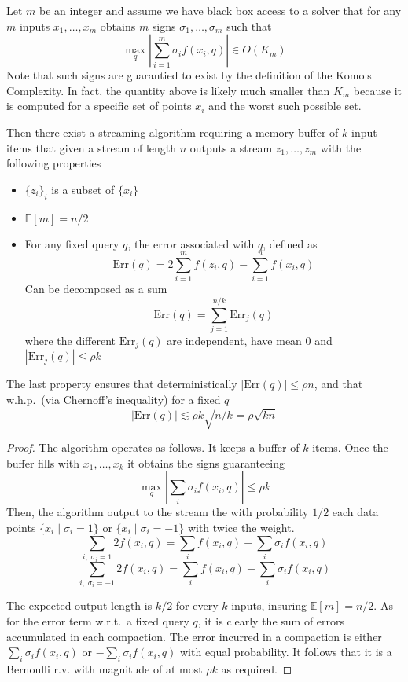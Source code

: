\documentclass[anon,12pt]{colt2019} %
\newcommand{\el}[1]{\textcolor{blue}{EL: #1}}
\newcommand{\E}{\mathbb{E}}
\begin{document}
\begin{lemma} \label{lem:compactor}
Let $m$ be an integer and assume we have black box access to a solver that for any $m$ inputs $x_1,\ldots,x_m$ obtains $m$ signs $\sigma_1,\ldots,\sigma_m$ such that
$$\max_q \left| \sum_{i=1}^{m} \sigma_i f(x_i, q)\right| \in O(K_m)$$
Note that such signs are guarantied to exist by the definition of the Komols Complexity. 
In fact, the quantity above is likely much smaller than $K_m$ because it is computed for a specific set of points $x_i$ and the worst such possible set.


Then there exist a streaming algorithm requiring a memory buffer of $k$ input items that given a stream of length $n$ outputs a stream $z_1,\ldots,z_m$ with the following properties
\begin{itemize}
\item $\{z_i\}_i$ is a subset of $\{x_i\}$
\item $\E[m] = n/2$
\item For any fixed query $q$, the error associated with $q$, defined as
$$\text{Err}(q) = 2\sum_{i=1}^m f(z_i,q) - \sum_{i=1}^n f(x_i,q)  $$
Can be decomposed as a sum
$$\text{Err}(q) = \sum_{j=1}^{n/k} \text{Err}_j(q)$$
where the different $\text{Err}_j(q)$ are independent, have mean 0 and $|\text{Err}_j(q)| \leq \rho k$
\end{itemize}
The last property ensures that deterministically $|\text{Err}(q)| \leq \rho n$, and that w.h.p.\ (via Chernoff's inequality) for a fixed $q$ 
$$|\text{Err}(q)| \lesssim \rho k\sqrt{n/k} = \rho \sqrt{kn}$$
\end{lemma}
\begin{proof}
The algorithm operates as follows. It keeps a buffer of $k$ items. Once the buffer fills with $x_1,\ldots,x_k$ it obtains the signs guaranteeing
$$\max_q \left| \sum_i \sigma_i f(x_i, q)\right| \leq \rho k$$
Then, the algorithm output to the stream the with probability $1/2$ each data points $\{x_i \; | \; \sigma_i = 1\}$ or $\{x_i \; | \; \sigma_i = -1\}$ with twice the weight.
$$\sum_{i ,\; \sigma_i=1} 2f(x_i, q) = \sum_{i} f(x_i, q) +  \sum_{i} \sigma_i f(x_i, q)$$
$$\sum_{i ,\; \sigma_i=-1} 2f(x_i, q) = \sum_{i} f(x_i, q) - \sum_{i} \sigma_i f(x_i, q)$$

The expected output length is $k/2$ for every $k$ inputs, insuring $\E[m]=n/2$. 
As for the error term w.r.t.\ a fixed query $q$, it is clearly the sum of errors accumulated in each compaction. The error incurred in a compaction is either 
$\sum_i \sigma_i f(x_i, q)$ or $-\sum_i \sigma_i f(x_i, q)$ with equal probability. It follows that it is a Bernoulli r.v. with magnitude of at most $\rho k$ as required.
\end{proof}
\end{document}
